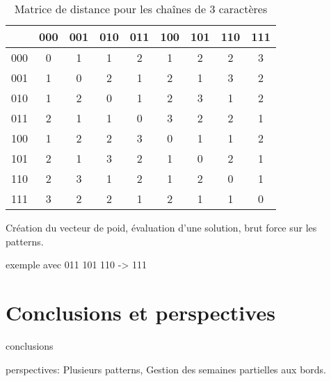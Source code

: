 \documentclass{roadef}
\begin{document}
\begin{table}[!ht]
    \begin{center}
        \begin{tabular}{|c|cccccccc|}
            \hline
            & 000 & 001 & 010 & 011 & 100 & 101 & 110 & 111\\
            \hline
            000 & 0 & 1 &   1 &   2 &   1 &   2 &   2 &   3\\
            001 & 1 & 0 &   2 &   1 &   2 &   1 &   3 &   2\\
            010 & 1 & 2 &   0 &   1 &   2 &   3 &   1 &   2\\
            011 & 2 & 1 &   1 &   0 &   3 &   2 &   2 &   1\\
            100 & 1 & 2 &   2 &   3 &   0 &   1 &   1 &   2\\
            101 & 2 & 1 &   3 &   2 &   1 &   0 &   2 &   1\\
            110 & 2 & 3 &   1 &   2 &   1 &   2 &   0 &   1\\
            111 & 3 & 2 &   2 &   1 &   2 &   1 &   1 &   0\\
            \hline
        \end{tabular}
        \caption{Matrice de distance pour les chaînes de 3 caractères}
    \label{matrice-distances}
    \end{center}
\end{table}

Création du vecteur de poid, évaluation d'une solution, brut force sur
les patterns.

exemple avec 011 101 110 -> 111

\section{Conclusions et perspectives}

conclusions

perspectives: Plusieurs patterns, Gestion des semaines partielles aux
bords.



\end{document}
